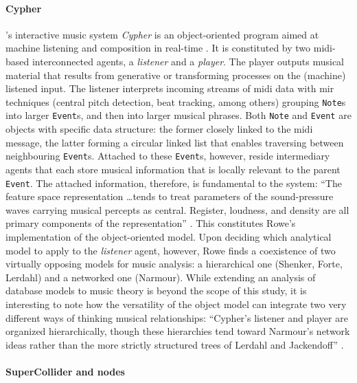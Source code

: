 	\paragraph{Cypher}
	\label{computer:cypher}

	\citeauthor{Row92:Int}'s interactive music system \textit{Cypher} is an object-oriented program aimed at machine listening and composition in real-time \parencite{Row92:Int}. It is constituted by two \gls{midi}-based interconnected agents, a \textit{listener} and a \textit{player}. The player outputs musical material that results from generative or transforming processes on the (machine) listened input. The listener interprets incoming streams of \gls{midi} data with \gls{mir} techniques (central pitch detection, beat tracking, among others) grouping \texttt{Note}s into larger \texttt{Event}s, and then into larger musical phrases. Both \texttt{Note} and \texttt{Event} are objects with specific data structure: the former closely linked to the \gls{midi} message, the latter forming a circular linked list that enables traversing between neighbouring \texttt{Event}s. Attached to these \texttt{Event}s, however, reside intermediary agents that each store musical information that is locally relevant to the parent \texttt{Event}. The attached information, therefore, is fundamental to the system: ``The feature space representation \dots tends to treat parameters of the sound-pressure waves carrying musical percepts as central. Register, loudness, and density are all primary components of the representation'' \parencite[Chapter~7]{Row92:Int}. This constitutes Rowe's implementation of the object-oriented model. Upon deciding which analytical model to apply to the \textit{listener} agent, however, Rowe finds a coexistence of two virtually opposing models for music analysis: a hierarchical one (Shenker, Forte, Lerdahl) and a networked one (Narmour). While extending an analysis of database models to music theory is beyond the scope of this study, it is interesting to note how the versatility of the object model can integrate two very different ways of thinking musical relationships: ``Cypher's listener and player are organized hierarchically, though these hierarchies tend toward Narmour's network ideas rather than the more strictly structured trees of Lerdahl and Jackendoff'' \parencite[Chapter~4.3]{Row92:Int}. 

	\paragraph{SuperCollider and nodes}
	\label{computer:supercollider}

